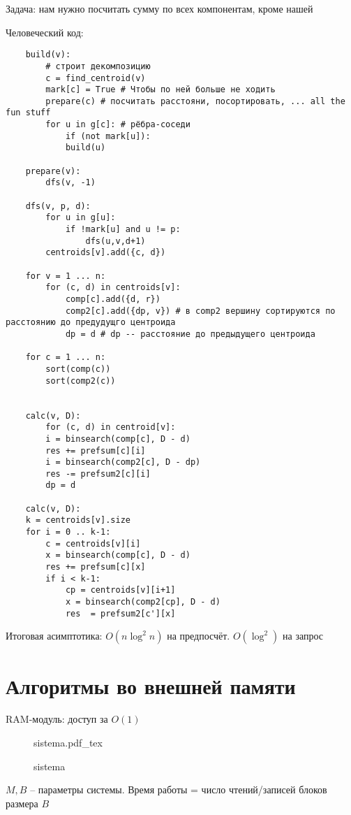 \documentclass{book}
\theoremstyle{definition}
\newcommand{\incfig}[1]{%
    \def\svgwidth{\columnwidth}
    {#1.pdf_tex}
}
\begin{document}
Задача: нам нужно посчитать сумму по всех компонентам, кроме нашей

Человеческий код:
\begin{lstlisting}
    build(v):
        # строит декомпозицию
        c = find_centroid(v)
        mark[c] = True # Чтобы по ней больше не ходить
        prepare(c) # посчитать расстояни, посортировать, ... all the fun stuff
        for u in g[c]: # рёбра-соседи
            if (not mark[u]):
            build(u)

    prepare(v):
        dfs(v, -1)
    
    dfs(v, p, d):
        for u in g[u]:
            if !mark[u] and u != p:
                dfs(u,v,d+1)
        centroids[v].add({c, d})

    for v = 1 ... n:
        for (c, d) in centroids[v]:
            comp[c].add({d, r})
            comp2[c].add({dp, v}) # в comp2 вершину сортируются по расстоянию до предудущго центроида
            dp = d # dp -- расстояние до предыдущего центроида

    for c = 1 ... n:
        sort(comp(c))
        sort(comp2(c))


    calc(v, D):
        for (c, d) in centroid[v]:
        i = binsearch(comp[c], D - d)
        res += prefsum[c][i]
        i = binsearch(comp2[c], D - dp)
        res -= prefsum2[c][i]
        dp = d

    calc(v, D):
    k = centroids[v].size
    for i = 0 .. k-1:
        c = centroids[v][i]
        x = binsearch(comp[c], D - d)
        res += prefsum[c][x]
        if i < k-1:
            cp = centroids[v][i+1]
            x = binsearch(comp2[cp], D - d)
            res  = prefsum2[c'][x]
\end{lstlisting}

Итоговая асимптотика: $O\left( n\log ^2 n \right) $ на предпосчёт. $O\left( \log ^2 \right)$ на запрос


\section{Алгоритмы во внешней памяти}

RAM-модуль: доступ за $O(1)$

\begin{figure}[!ht]
    \centering
    \incfig{sistema}
    \caption{sistema}
    \label{fig:sistema}
\end{figure}


$M, B$ -- параметры системы. Время работы = число чтений/записей блоков размера  $B$
\end{document}
